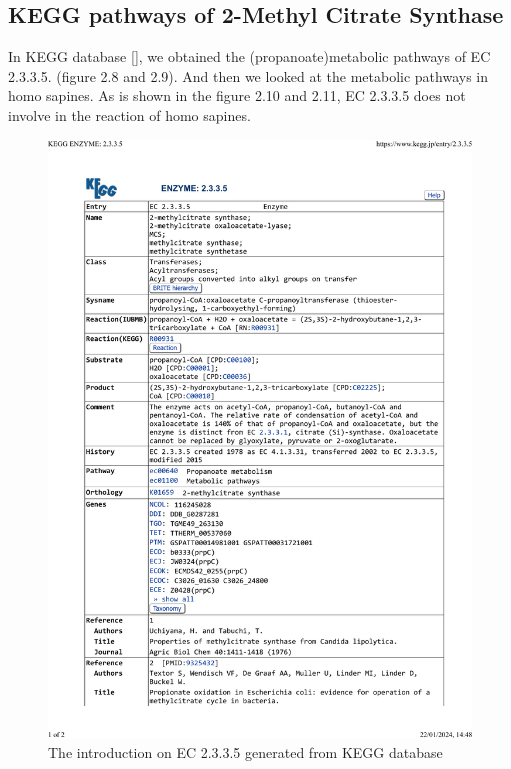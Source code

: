 \documentclass[a4paper,english,12pt,bibliography=totoc]{scrreprt}
\begin{document}
\subsection{KEGG pathways of 2-Methyl Citrate Synthase}
In KEGG database [\cite{kanehisa_kegg_2023}], we obtained the (propanoate)metabolic pathways of EC 2.3.3.5. (figure 2.8 and 2.9). And then we looked at the metabolic pathways in homo sapines. As is shown in the figure 2.10 and 2.11, EC 2.3.3.5 does not involve in the reaction of homo sapines.

\begin{figure}[H]
    \centering
    \includegraphics[width=0.9\linewidth]{Kegg 2-3-3-5 Hyperlink.pdf}
    \caption{The introduction on EC 2.3.3.5 generated from KEGG database}
\end{figure}
\end{document}
